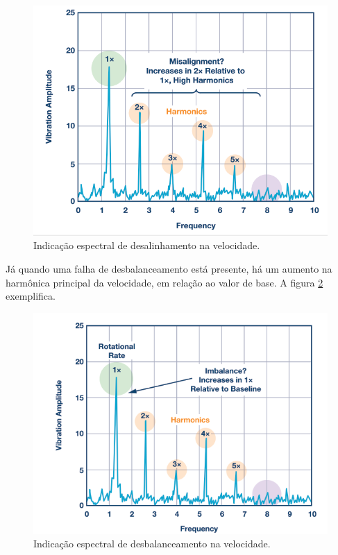 \begin{figure}[H]
    \caption{Indicação espectral de desalinhamento na velocidade.}
    \begin{center}
        \includegraphics[scale=.4]{referencial/img/misa_analog_p2.png}
    \end{center}
    \label{fig:misa_analog_p2}
\end{figure}

Já quando uma falha de desbalanceamento está presente, há um aumento na harmônica principal da velocidade, em relação ao valor de base.
A figura \ref{fig:imbalance_analog_p2} exemplifica.

\begin{figure}[H]
    \caption{Indicação espectral de desbalanceamento na velocidade.}
    \begin{center}
        \includegraphics[scale=.5]{referencial/img/imbalance_analog_p2.png}
    \end{center}
    \label{fig:imbalance_analog_p2}
\end{figure}

